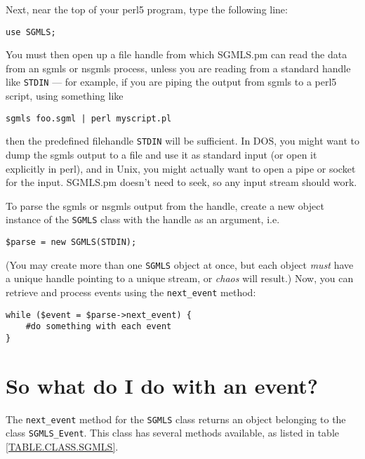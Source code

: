 Next, near the top of your {\sc perl5} program, type the following
line:

{\footnotesize\begin{verbatim}
use SGMLS;
\end{verbatim}}

You must then open up a file handle from which {\sc SGMLS.pm} can read the
data from an {\sc sgmls} or {\sc nsgmls} process, unless you are reading from
a standard handle like {\tt STDIN} {---} for example,
if you are piping the output from {\sc sgmls} to a {\sc perl5} script, using
something like

{\footnotesize\begin{verbatim}
sgmls foo.sgml | perl myscript.pl
\end{verbatim}}

then the predefined filehandle {\tt STDIN} will be
sufficient.  In DOS, you might want to dump the sgmls output to a file
and use it as standard input (or open it explicitly in perl), and in
Unix, you might actually want to open a pipe or socket for the input.
{\sc SGMLS.pm} doesn't need to seek, so any input stream should
work.

To parse the {\sc sgmls} or {\sc nsgmls} output from the handle, create
a new object instance of the {\tt SGMLS} class with
the handle as an argument, i.e.

{\footnotesize\begin{verbatim}
$parse = new SGMLS(STDIN);
\end{verbatim}}

(You may create more than one {\tt SGMLS}
object at once, but each object {\em must\/} have a
unique handle pointing to a unique stream, or
{\em chaos\/} will result.)  Now, you can retrieve and
process events using the {\tt next\_event} method:

{\footnotesize\begin{verbatim}
while ($event = $parse->next_event) {
    #do something with each event
}
\end{verbatim}}




\section{So what do I do with an event?}
\label{SGMLSEVENT}


The {\tt next\_event} method for the {\tt SGMLS} class returns an
object belonging to the class {\tt SGMLS\_Event}.
This class has several methods available, as listed in table \ref{TABLE.CLASS.SGMLS}.

